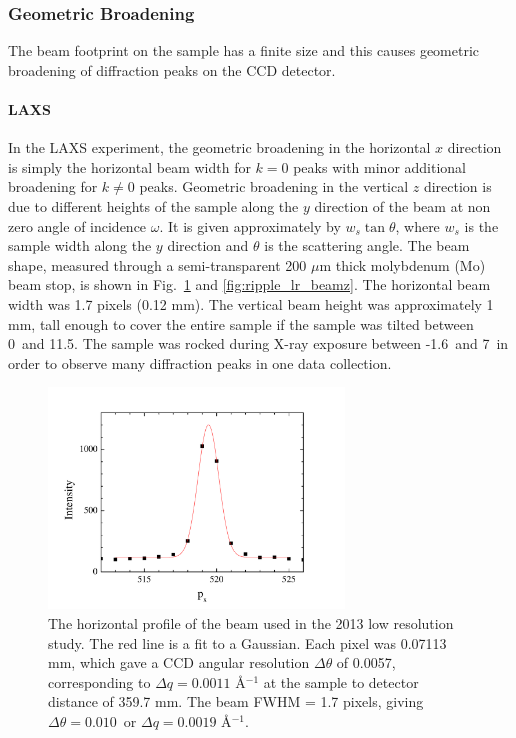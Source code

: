 \subsubsection{Geometric Broadening}\label{sec:geometric_broadening}
The beam footprint on the sample has a finite size and this causes
geometric broadening of diffraction peaks on the CCD detector.

\paragraph{LAXS}
In the LAXS experiment, 
the geometric broadening in the horizontal $x$ direction is simply the 
horizontal beam width for $k=0$ peaks with minor additional broadening
for $k\neq 0$ peaks. Geometric broadening in the vertical $z$ direction
is due to different heights of the sample along the $y$ direction of the beam 
at non zero angle of incidence $\omega$. It is given approximately by
$w_s\tan\theta$, where $w_s$ is the sample width along the $y$
direction and $\theta$ is the scattering angle.
The beam shape, measured through a semi-transparent 200 $\mu$m thick
molybdenum (Mo) beam stop, is shown in Fig.~\ref{fig:ripple_lr_beamx}
and \ref{fig:ripple_lr_beamz}.
The horizontal beam width was 1.7 pixels (0.12 mm). The vertical beam
height was approximately 1 mm, tall enough to cover the entire sample
if the sample was tilted between 0\textdegree\ and 11.5\textdegree. 
The sample was rocked
during X-ray exposure between -1.6\textdegree\ and 7\textdegree\ 
in order to observe many diffraction peaks in one data collection.

\begin{figure}[p]
  \centering
  \includegraphics[width=0.7\textwidth]{figures/ripple/MMs/laxs/beamx_lr}
  \caption{The horizontal profile of the beam used in the 2013 low resolution study.
  The red line is a fit to a Gaussian.
  Each pixel was 0.07113 mm, which gave a CCD angular resolution $\Delta\theta$ of 
  0.0057\textdegree, corresponding to $\Delta q=0.0011$ \AA$^{-1}$ at the 
  sample to detector distance of 359.7 mm. 
  The beam FWHM = 1.7 pixels, giving $\Delta\theta = 0.010$\textdegree\ or
  $\Delta q= 0.0019$ \AA$^{-1}$.}
  \label{fig:ripple_lr_beamx}
\end{figure}

